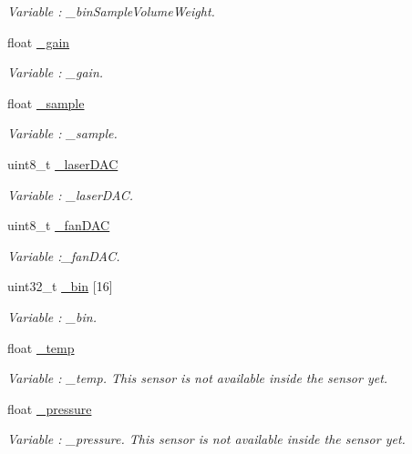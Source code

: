 \begin{DoxyCompactItemize}
\begin{DoxyCompactList}\small\item\em Variable \+: \+\_\+bin\+Sample\+Volume\+Weight. \end{DoxyCompactList}\item 
float \hyperlink{class_wasp_o_p_c___n2_a0330e72731f0012f42d0860fa1736170}{\+\_\+gain}
\begin{DoxyCompactList}\small\item\em Variable \+: \+\_\+gain. \end{DoxyCompactList}\item 
float \hyperlink{class_wasp_o_p_c___n2_a8b4d5da4c9cb9d892345ddef37beb3a2}{\+\_\+sample}
\begin{DoxyCompactList}\small\item\em Variable \+: \+\_\+sample. \end{DoxyCompactList}\item 
uint8\+\_\+t \hyperlink{class_wasp_o_p_c___n2_a42c4151482bde09970432c2cb2856091}{\+\_\+laser\+D\+AC}
\begin{DoxyCompactList}\small\item\em Variable \+: \+\_\+laser\+D\+AC. \end{DoxyCompactList}\item 
uint8\+\_\+t \hyperlink{class_wasp_o_p_c___n2_ab9608d0ce5f797b60cb4dcad2ec92a26}{\+\_\+fan\+D\+AC}
\begin{DoxyCompactList}\small\item\em Variable \+:\+\_\+fan\+D\+AC. \end{DoxyCompactList}\item 
uint32\+\_\+t \hyperlink{class_wasp_o_p_c___n2_acd6d3c076e84551906f17691b38b6804}{\+\_\+bin} \mbox{[}16\mbox{]}
\begin{DoxyCompactList}\small\item\em Variable \+: \+\_\+bin. \end{DoxyCompactList}\item 
float \hyperlink{class_wasp_o_p_c___n2_a3a63682f3305ca59ae694c7bd441e058}{\+\_\+temp}
\begin{DoxyCompactList}\small\item\em Variable \+: \+\_\+temp. This sensor is not available inside the sensor yet. \end{DoxyCompactList}\item 
float \hyperlink{class_wasp_o_p_c___n2_a953daf3e10c2c57b43e16da351c1e751}{\+\_\+pressure}
\begin{DoxyCompactList}\small\item\em Variable \+: \+\_\+pressure. This sensor is not available inside the sensor yet. \end{DoxyCompactList}\item 

\end{DoxyCompactItemize}
